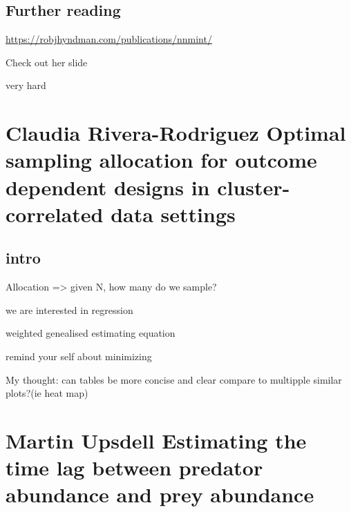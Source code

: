 \documentclass[
]{book}
\begin{document}
\hypertarget{further-reading}{%
\section{Further reading}\label{further-reading}}

\url{https://robjhyndman.com/publications/nnmint/}

Check out her slide

very hard

\hypertarget{claudia-rivera-rodriguez-optimal-sampling-allocation-for-outcome-dependent-designs-in-cluster-correlated-data-settings}{%
\chapter*{Claudia Rivera-Rodriguez \textbar{} Optimal sampling allocation for outcome dependent designs in cluster-correlated data settings}\label{claudia-rivera-rodriguez-optimal-sampling-allocation-for-outcome-dependent-designs-in-cluster-correlated-data-settings}}

\hypertarget{intro}{%
\section{intro}\label{intro}}

Allocation =\textgreater{} given N, how many do we sample?

we are interested in regression

weighted genealised estimating equation

remind your self about minimizing

My thought: can tables be more concise and clear compare to multipple similar plots?(ie heat map)

\hypertarget{martin-upsdell-estimating-the-time-lag-between-predator-abundance-and-prey-abundance}{%
\chapter*{Martin Upsdell \textbar{} Estimating the time lag between predator abundance and prey abundance}\label{martin-upsdell-estimating-the-time-lag-between-predator-abundance-and-prey-abundance}}
\end{document}
